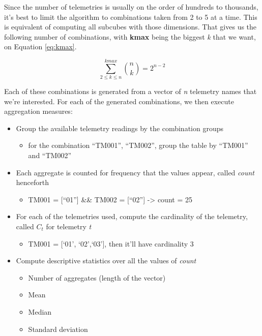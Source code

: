 Since the number of telemetries is usually on the order of hundreds to thousands, it's best to limit the algorithm to combinations taken from 2 to 5 at a time.
This is equivalent of computing all subcubes with those dimensions.
That gives us the following number of combinations, with \textbf{kmax} being the biggest \emph{k} that we want, on Equation \ref{eq:kmax}.

\begin{equation} \label{eq:kmax}
\sum_{2\leq{k}\leq{n}}^{kmax}\binom nk = 2^{n-2}
\end{equation}

Each of these combinations is generated from a vector of \emph{n} telemetry names that we're interested.
For each of the generated combinations, we then execute aggregation measures:

\begin{itemize}[noitemsep]
\item
  Group the available telemetry readings by the combination groups
  \begin{itemize}
  \item
    for the combination ``TM001'', ``TM002'', group the table by ``TM001'' and ``TM002''
  \end{itemize}
\item
  Each aggregate is counted for frequency that the values appear, called \emph{count} henceforth

  \begin{itemize}
  \item
    TM001 = [``01''] \&\& TM002 = [``02''] -\textgreater{} count = 25
  \end{itemize}
\item
  For each of the telemetries used, compute the cardinality of the telemetry, called \(C_t\) for telemetry \emph{t}

  \begin{itemize}
  \item
    TM001 = [`01', `02',`03'], then it'll have cardinality 3
  \end{itemize}
\item
  Compute descriptive statistics over all the values of \emph{count}

  \begin{itemize}[noitemsep]
  \item Number of aggregates (length of the vector)
  \item Mean
  \item Median
  \item Standard deviation
  \end{itemize}
\end{itemize}

